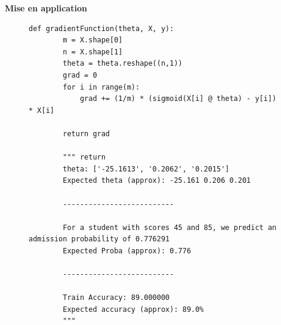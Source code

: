 \vspace{.5cm}
    \noindent
    \textbf{Mise en application}
    \vspace{.2cm}

\begin{figure}[!h]
\begin{verbatim}
def gradientFunction(theta, X, y):
        m = X.shape[0]  
        n = X.shape[1]   
        theta = theta.reshape((n,1)) 
        grad = 0
        for i in range(m):
            grad += (1/m) * (sigmoid(X[i] @ theta) - y[i]) * X[i]

        return grad

        """ return 
        theta: ['-25.1613', '0.2062', '0.2015']
        Expected theta (approx): -25.161 0.206 0.201
        
        -------------------------- 
        
        For a student with scores 45 and 85, we predict an admission probability of 0.776291
        Expected Proba (approx): 0.776
        
        -------------------------- 
        
        Train Accuracy: 89.000000
        Expected accuracy (approx): 89.0%
        """
\end{verbatim}   
\end{figure}


